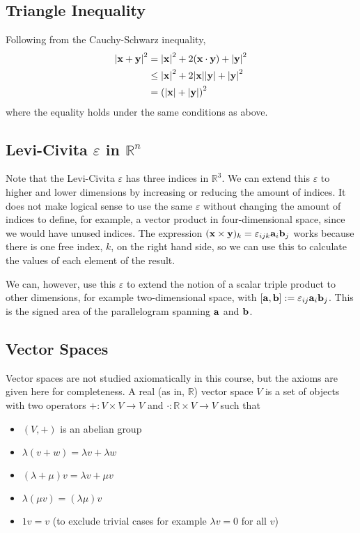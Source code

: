 \documentclass{article}
\begin{document}
\subsection{Triangle Inequality}
Following from the Cauchy-Schwarz inequality,
\begin{align*}
    \abs{\vb x + \vb y}^2
     & = \abs{\vb x}^2 + 2(\vb x \cdot \vb y) + \abs{\vb y}^2        \\
     & \leq \abs{\vb x}^2 + 2 \abs{\vb x}\abs{\vb y} + \abs{\vb y}^2 \\
     & = \left(\abs{\vb x} + \abs{\vb y}\right)^2
\end{align*}
where the equality holds under the same conditions as above.

\subsection{Levi-Civita $\varepsilon$ in $\mathbb R^n$}
Note that the Levi-Civita $\varepsilon$ has three indices in $\mathbb R^3$. We can extend this $\varepsilon$ to higher and lower dimensions by increasing or reducing the amount of indices. It does not make logical sense to use the same $\varepsilon$ without changing the amount of indices to define, for example, a vector product in four-dimensional space, since we would have unused indices. The expression $(\vb x \times \vb y)_k = \varepsilon_{ijk} \vb a_i \vb b_j$ works because there is one free index, $k$, on the right hand side, so we can use this to calculate the values of each element of the result.

We can, however, use this $\varepsilon$ to extend the notion of a scalar triple product to other dimensions, for example two-dimensional space, with $[\vb a, \vb b] := \varepsilon_{ij} \vb a_i \vb b_j$. This is the signed area of the parallelogram spanning $\vb a$ and $\vb b$.

\subsection{Vector Spaces}
Vector spaces are not studied axiomatically in this course, but the axioms are given here for completeness. A real (as in, $\mathbb R$) vector space $V$ is a set of objects with two operators $+: V \times V \to V$ and $\cdot: \mathbb R \times V \to V$ such that
\begin{itemize}
    \item $(V, +)$ is an abelian group
    \item $\lambda(v + w) = \lambda v + \lambda w$
    \item $(\lambda + \mu)v = \lambda v + \mu v$
    \item $\lambda(\mu v) = (\lambda \mu) v$
    \item $1v = v$ (to exclude trivial cases for example $\lambda v = 0$ for all $v$)
\end{itemize}
\end{document}
